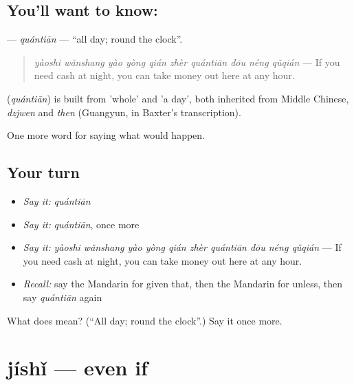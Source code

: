 \subsection*{You'll want to know: }
\textbf{} — \emph{quántiān} — \textquotedblleft{}all day; round the clock\textquotedblright{}.

\begin{quote}
\textbf{} \emph{yàoshi wǎnshang yào yòng qián zhèr quántiān dōu néng qǔqián} — If you need cash at night, you can take money out here at any hour.
\end{quote}

\begin{cousinweb}
\textbf{} (\emph{quántiān}) is built from  'whole' and  'a day', both inherited from Middle Chinese, \emph{dzjwen} and \emph{then} (Guangyun, in Baxter's transcription).
\end{cousinweb}

\begin{grammarlens}[title={What you've built}]
One more word for saying what would happen.
\end{grammarlens}

\subsection*{Your turn}
\begin{itemize}
\raggedright
  \item \emph{Say it:} \emph{quántiān}
  \item \emph{Say it:} \emph{quántiān}, once more
  \item \emph{Say it:} \emph{yàoshi wǎnshang yào yòng qián zhèr quántiān dōu néng qǔqián} — If you need cash at night, you can take money out here at any hour.
  \item \emph{Recall:} say the Mandarin for given that, then the Mandarin for unless, then say \emph{quántiān} again
\end{itemize}

\begin{tcolorbox}[breakable,colback=teal!4,colframe=teal!35!black,title={Before you move on}]
What does  mean? (\textquotedblleft{}All day; round the clock\textquotedblright{}.) Say it once more.
\end{tcolorbox}
\section[jíshǐ]{jíshǐ — even if}


